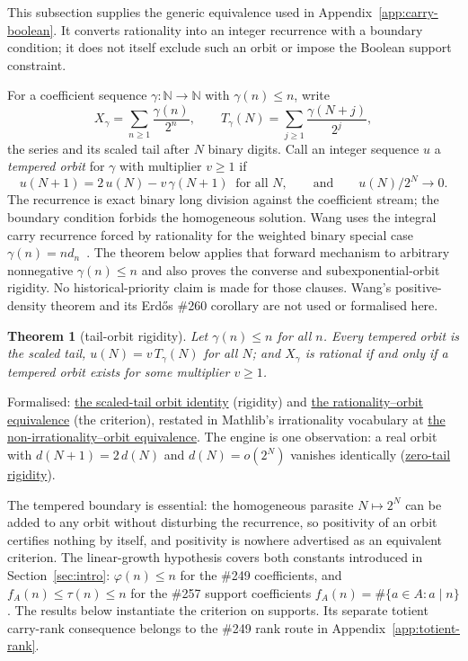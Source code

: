 \documentclass[11pt]{article}
\newcommand{\commit}{bb4e24651b37cd096d3749ef299c3317930b3a3b}
\newcommand{\repobase}{https://github.com/wcook04/plectis-lean-erdos249-257/blob/\commit}
\newcommand{\PK}{Erdos249257}
\newcommand{\lword}[4]{\href{\repobase/\PK/#1\#L#2}{#4}}
\newtheorem{theorem}{Theorem}[section]
\theoremstyle{definition}
\theoremstyle{remark}
\newcommand{\N}{\mathbb{N}}
\newcommand{\ph}{\varphi}
\begin{document}
This subsection supplies the generic equivalence used in
Appendix~\ref{app:carry-boolean}.
It converts rationality into an integer recurrence with a boundary condition;
it does not itself exclude such an orbit or impose the Boolean support
constraint.

For a coefficient sequence $\gamma:\N\to\N$ with $\gamma(n)\le n$, write
\[
X_\gamma=\sum_{n\ge1}\frac{\gamma(n)}{2^n},
\qquad
T_\gamma(N)=\sum_{j\ge1}\frac{\gamma(N+j)}{2^j},
\]
the series and its scaled tail after $N$ binary digits. Call an integer
sequence $u$ a \emph{tempered orbit} for $\gamma$ with multiplier $v\ge1$ if
\[
u(N+1)=2\,u(N)-v\,\gamma(N+1)\ \text{ for all } N,
\qquad\text{and}\qquad
u(N)/2^N\to0 .
\]
The recurrence is exact binary long division against the coefficient stream;
the boundary condition forbids the homogeneous solution. Wang uses the
integral carry recurrence forced by rationality for the weighted binary
special case
$\gamma(n)=n d_n$~\cite[Proposition~3.1, pp.~5--6]{wang2026}. The theorem below applies that
forward mechanism to arbitrary nonnegative $\gamma(n)\le n$ and also proves
the converse and subexponential-orbit rigidity.  No historical-priority claim
is made for those clauses. Wang's positive-density theorem and its Erd\H{o}s
\#260 corollary are not used or formalised here.

\begin{theorem}[tail-orbit rigidity]\label{res:rigidity}
Let $\gamma(n)\le n$ for all $n$. Every tempered orbit is the scaled tail,
$u(N)=v\,T_\gamma(N)$ for all $N$; and $X_\gamma$ is rational if and only if a tempered
orbit exists for some multiplier $v\ge1$.
\end{theorem}
\noindent Formalised:
\lword{GenericTailOrbitRigidity.lean}{339}{temperedBinaryOrbit_eq_scaledTail}{the scaled-tail orbit identity}
(rigidity) and
\lword{GenericTailOrbitRigidity.lean}{426}{binaryCoeffSeries_rational_iff_exists_temperedBinaryOrbit}{the rationality--orbit equivalence}
(the criterion), restated in Mathlib's irrationality vocabulary at
\lword{GenericTailOrbitRigidity.lean}{435}{not_irrational_binaryCoeffSeries_iff_exists_temperedBinaryOrbit}{the non-irrationality--orbit equivalence}.
The engine is one observation: a real orbit with $d(N+1)=2\,d(N)$ and
$d(N)=o(2^N)$ vanishes identically
(\lword{GenericTailOrbitRigidity.lean}{315}{doublingOrbit_eq_zero_of_tempered}{zero-tail rigidity}).

The tempered boundary is essential: the
homogeneous parasite $N\mapsto2^N$ can be added to any orbit without
disturbing the recurrence, so positivity of an orbit certifies nothing by
itself, and positivity is nowhere advertised as an equivalent criterion. The
linear-growth hypothesis covers both constants introduced in
Section~\ref{sec:intro}:
$\ph(n)\le n$ for the \#249 coefficients, and $f_A(n)\le\tau(n)\le n$ for the
\#257 support coefficients $f_A(n)=\#\{a\in A:a\mid n\}$.  The results below
instantiate the criterion on supports.  Its separate totient
carry-rank consequence belongs to the \#249 rank route in
Appendix~\ref{app:totient-rank}.
\end{document}
